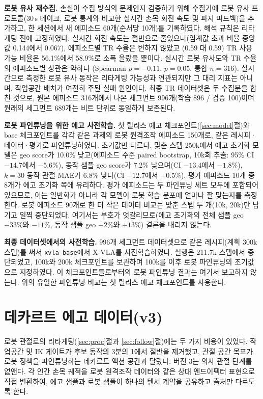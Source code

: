 \documentclass[conference,10pt]{IEEEtran}
\begin{document}
\textbf{로봇 유사 재수집.} 손실이 수집 방식의 문제인지 검증하기 위해 수집기에 로봇 유사 프로토콜(30\,s 테이크, 로봇 통계와 비교한
실시간 손목 회전 속도 및 파지 피드백)을 추가하고, 한 세션에서 새 에피소드 60개(순서당 10개)를 기록하였다. 해석 규칙은 리타게팅 전에
고정하였다. 실시간 회전 속도는 절반으로 줄었으나(임계값 초과 비율 중앙값 0.144에서 0.067), 에피소드별 TR 수율은 변하지 않았고
(0.59 대 0.59) TR 사용 가능 비율은 56.1\%에서 58.9\%로 소폭 올랐을 뿐이다. 실시간 로봇 유사도와 TR 수율의 에피소드별 상관은 약하다
(Spearman $\rho=-0.11$, $p=0.05$, 통합 $n=316$). 실시간으로 측정한 로봇 유사 동작은 리타게팅 가능성과 연관되지만 그 대리 지표는
아니며, 작업공간 배치가 여전히 주된 실패 원인이다. 최종 TR 데이터셋은 두 수집분을 합친 것으로, 원본 에피소드 316개에서 나온 세그먼트
996개(학습 896 / 검증 100)이며 원래의 세그먼트 689개는 비트 단위로 동일하게 보존된다.

\textbf{로봇 파인튜닝을 위한 에고 사전학습.} 첫 릴리스 에고 체크포인트(\ref{sec:model}절)와 base 체크포인트를 각각 같은 과제의 로봇
원격조작 에피소드 150개로, 같은 레시피·데이터·평가로 파인튜닝하였다. 초기값만 다르다. 맞춘 스텝 250k에서 에고 초기화 모델은 geo score가
10.0\% 낮고(에피소드 수준 paired bootstrap, 10k회 추출: 95\% CI $-14.7$에서 $-5.6\%$), 동작 샘플 geo score가 7.2\% 낮으며(CI $-13.4$에서
$-1.8\%$), $k{=}30$ 동작 관절 MAE가 6.8\% 낮다(CI $-12.7$에서 $+0.5\%$). 평가 에피소드 10개 중 8개가 에고 초기화 쪽에 유리하다. 평가
에피소드는 두 파인튜닝 세트 모두에 포함되어 있으므로, 이는 일반화가 아니라 각 모델이 로봇 학습 분포에 얼마나 잘 맞는지를 측정한다.
로봇 에피소드 90개로 한 더 작은 데이터 비교는 맞춘 스텝 두 개(10k, 20k)만 남기고 일찍 중단되었다. 여기서는 부호가 엇갈리므로(에고
초기화의 전체 샘플 geo $-33\%$와 $-11\%$, 동작 샘플 geo $+2\%$와 $+13\%$) 결론을 내리지 않는다.

\textbf{최종 데이터셋에서의 사전학습.} 996개 세그먼트 데이터셋으로 같은 레시피(계획 300k 스텝)를 써서 \texttt{xvla-base}에서 X-VLA를
사전학습하였다. 실행은 211.7k 스텝에서 중단되었고, 100k와 200k 체크포인트를 보관하며 100k를 이후 로봇 파인튜닝의 초기값으로 지정하였다.
이 체크포인트들로부터의 로봇 파인튜닝 결과는 여기서 보고하지 않는다. 위의 유일한 파인튜닝 비교는 첫 릴리스 에고 체크포인트를 사용한다.

\section{데카르트 에고 데이터(v3)}\label{sec:v3}
로봇 관절로의 리타게팅(\ref{sec:proc}절과 \ref{sec:follow}절)에는 두 가지 비용이 있었다. 작업공간 및 IK 게이트가 후보 동작의 3분의 1에서
절반을 제거했고, 관절 공간 목표가 로봇 정책을 파인튜닝하는 데카르트 액션 공간과 달랐다. 버전 3는 의사 관절 단계를 없앤다. 각 인간 손목
궤적을 로봇 원격조작 데이터와 같은 상대 엔드이펙터 표현으로 직접 변환하여, 에고 샘플과 로봇 샘플이 하나의 텐서 계약을 공유하고 출처만
다르도록 한다.
\end{document}
